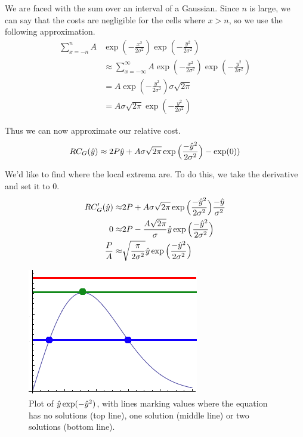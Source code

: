 We are faced with the sum over an interval of a Gaussian. Since $n$ is large, we can say that the costs are negligible for the cells where $x>n$, so we use the following approximation. 
\begin{align*}
        \sum\limits_{x=-n}^{n} A&\exp\left(-\frac{x^2}{2\sigma^2}\right)\exp\left(-\frac{y^2}{2\sigma^2}\right) \\
&\approx \sum\limits_{x=-\infty}^{\infty} A\exp\left(-\frac{x^2}{2\sigma^2}\right)\exp\left(-\frac{y^2}{2\sigma^2}\right)  \\
&= A\exp\left(-\frac{y^2}{2\sigma^2}\right)\sigma\sqrt{2\pi} \\
&= A\sigma\sqrt{2\pi}\exp\left(-\frac{y^2}{2\sigma^2}\right)
\end{align*}

Thus we can now approximate our relative cost. 
\[
RC_G(\hat{y}) \approx 2P\hat{y} + A\sigma\sqrt{2\pi} \exp\Big(\frac{-\hat{y}^2}{2\sigma^2}\Big) - \exp(0) ) \\
\]

We'd like to find where the local extrema are. To do this, we take the derivative and set it to 0. 
\begin{align}
RC'_G(\hat{y}) \approx& 2P + A\sigma\sqrt{2\pi}             \exp\Big( \frac{-\hat{y}^2}{2\sigma^2} \Big) \frac{-\hat{y}}{\sigma^2}\notag\\
0  \approx& 2P - \frac{A\sqrt{2\pi}}{\sigma}        \hat{y} \exp\Big( \frac{-\hat{y}^2}{2\sigma^2} \Big) \notag\\
  \frac{P}{A} \approx& \sqrt{\frac{\pi}{2\sigma^2}} \hat{y} \exp\Big( \frac{-\hat{y}^2}{2\sigma^2} \Big) 
\end{align}
\begin{figure}
\centering
\includegraphics[width=0.4\columnwidth]{graphix/lambert.png}
\caption{Plot of $\hat{y} \exp(-\hat{y}^2)$, with lines marking values where the equation has no solutions (top line), one solution (middle line) or two solutions (bottom line).}
\label{fig:lambert}
\end{figure}

